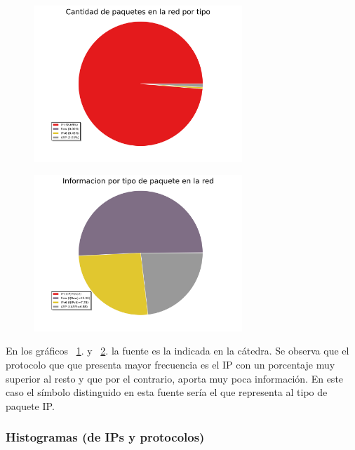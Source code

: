 \begin{figure}[h!]
  \centering
   \includegraphics[width=0.7\textwidth]{graficos/red_domestica_pie_type.png}
  \caption{}
  \label{fig:red_domestica_pie_type}
\end{figure}

\begin{figure}[h!]
  \centering
   \includegraphics[width=0.7\textwidth]{graficos/red_domestica_pie_type_information.png}
  \caption{}
  \label{fig:red_domestica_pie_type_information}
\end{figure}

En los gráficos ~\ref{fig:red_domestica_pie_type}. y ~\ref{fig:red_domestica_pie_type_information}. la fuente es la indicada en la cátedra. 
Se observa que el protocolo que que presenta mayor frecuencia es el IP con un porcentaje muy superior al resto y que por el contrario, aporta muy poca información. En este caso el símbolo distinguido en esta fuente sería el que representa al tipo de paquete IP.

\subsubsection{Histogramas (de IPs y protocolos)}


